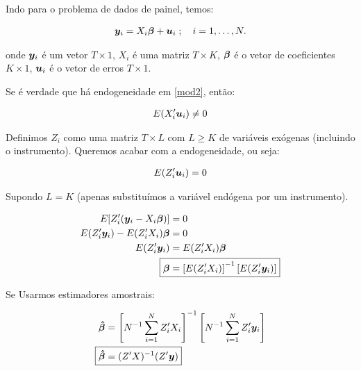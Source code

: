\documentclass[11pt,oneside,a4paper]{article}
\numberwithin{equation}{section}
\begin{document}
Indo para o problema de dados de painel, temos:

\vspace{-1 em}
\begin{align} \label{mod2}
	\boldsymbol{y}_{i} = X_{i} \boldsymbol{\beta} + \boldsymbol{u}_{i}
	\; ; \quad i = 1, \dots, N.
\end{align}

\noindent
onde 
$\boldsymbol{y}_{i}$ é um vetor $T \times 1$,
$X_{i}$ é uma matriz $T \times K$,
$\boldsymbol{\beta}$ é o vetor de coeficientes $K \times 1$,
$\boldsymbol{u}_{i}$ é o vetor de erros $T \times 1$.

Se é verdade que há endogeneidade em \eqref{mod2}, então:

\vspace{-1 em}
\begin{align*}
	E(X_{i}^{\prime} \boldsymbol{u}_{i}) \neq 0
\end{align*}

Definimos $Z_{i}$ como uma matriz $T \times L$ com $L \geq K$ de variáveis exógenas (incluindo o instrumento).
Queremos acabar com a endogeneidade, ou seja:

\vspace{-1 em}
\begin{align*}
	E(Z_{i}^{\prime} \boldsymbol{u}_{i}) = 0
\end{align*}

Supondo $L = K$ (apenas substituímos a variável endógena por um instrumento).

\vspace{-1 em}
\begin{align*}
E[ Z_{i}^{\prime} ( \mbs{y}_{i} - X_{i} \mbs{\beta} ) ] &= 0
\\
E( Z_{i}^{\prime} \mbs{y}_{i} ) - E( Z_{i}^{\prime} X_{i} ) \mbs{\beta} &= 0
\\
E( Z_{i}^{\prime} \mbs{y}_{i} ) &= E( Z_{i}^{\prime} X_{i} ) \mbs{\beta}
\\
\Aboxed{
\mbs{\beta} &=
\left[ E( Z_{i}^{\prime} X_{i} ) \right]^{-1}
\left[ E( Z_{i}^{\prime} \mbs{y}_{i} ) \right]
}
\end{align*}

Se Usarmos estimadores amostrais:

\vspace{-1 em}
\begin{align*}
\mbs{\hat{\beta}} &=
\left[ N^{-1} \sum_{i=1}^{N} Z_{i}^{\prime} X_{i} \right]^{-1}
\left[ N^{-1} \sum_{i=1}^{N} Z_{i}^{\prime} \mbs{y}_{i} \right]
\\
\Aboxed{
\mbs{\hat{\beta}} &=
( Z^{\prime} X )^{-1} ( Z^{\prime} \mbs{y} ) }
\end{align*}
\end{document}
